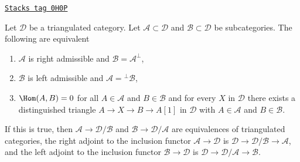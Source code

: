 \begin{proposition}
\label{derived-proposition-summarize-admissible}
\href{https://stacks.math.columbia.edu/tag/0H0P}{\texttt{Stacks tag 0H0P}}

Let $\mathcal{D}$ be a triangulated category. Let
$\mathcal{A} \subset \mathcal{D}$ and $\mathcal{B} \subset \mathcal{D}$
be subcategories. The following are equivalent
\begin{enumerate}
\item $\mathcal{A}$ is right admissible and $\mathcal{B} = \mathcal{A}^\perp$,
\item $\mathcal{B}$ is left admissible and $\mathcal{A} = {}^\perp\mathcal{B}$,
\item $\Hom(A, B) = 0$ for all $A \in \mathcal{A}$ and $B \in \mathcal{B}$
and for every $X$ in $\mathcal{D}$ there exists a distinguished triangle
$A \to X \to B \to A[1]$ in $\mathcal{D}$ with $A \in \mathcal{A}$ and
$B \in \mathcal{B}$.
\end{enumerate}
If this is true, then
$\mathcal{A} \to \mathcal{D}/\mathcal{B}$ and
$\mathcal{B} \to \mathcal{D}/\mathcal{A}$ are equivalences
of triangulated categories,
the right adjoint to the inclusion functor $\mathcal{A} \to \mathcal{D}$
is $\mathcal{D} \to \mathcal{D}/\mathcal{B} \to \mathcal{A}$, and
the left adjoint to the inclusion functor $\mathcal{B} \to \mathcal{D}$
is $\mathcal{D} \to \mathcal{D}/\mathcal{A} \to \mathcal{B}$.
\end{proposition}

